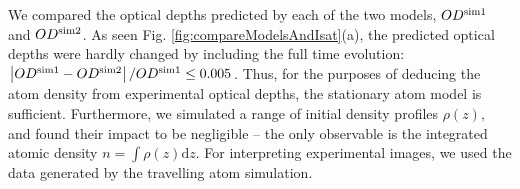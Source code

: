 \documentclass[12pt]{iopart}
\begin{document}
\par We compared the optical depths predicted by each of the two models, $OD^{\rm{sim1}}$ and $OD^{\rm{sim2}}$. As seen Fig. \ref{fig:compareModelsAndIsat}(a), the predicted optical depths were hardly changed by including the full time evolution:  $\left|OD^{\rm{sim1}}-OD^{\rm{sim2}}\right|/OD^{\rm{sim1}} \le 0.005$. Thus, for the purposes of deducing the atom density from experimental optical depths, the stationary atom model is sufficient. Furthermore, we simulated a range of initial density profiles $\rho(z)$, and found their impact to be negligible \--- the only observable is the integrated atomic density $n=\int\rho(z)\mathrm{d}z$. For interpreting experimental images, we used the data generated by the travelling atom simulation.
\begin{figure}

\end{figure}
\end{document}
